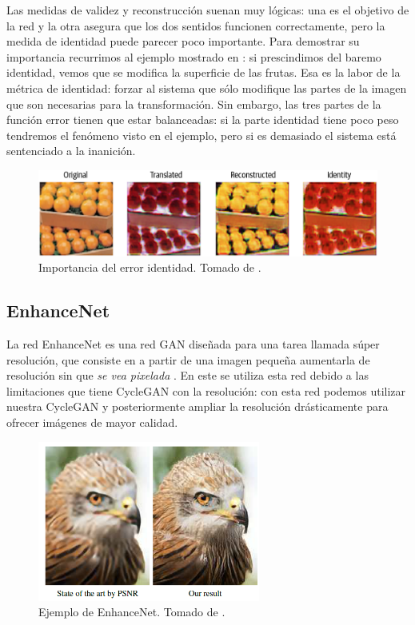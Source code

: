 \documentclass[../main.tex]{subfiles}
\begin{document}
Las medidas de validez y reconstrucción suenan muy lógicas: una es el objetivo de la red y la otra asegura que los dos sentidos funcionen correctamente, pero la medida de identidad puede parecer poco importante. Para demostrar su importancia recurrimos al ejemplo mostrado en \cite{Foster2019}: si prescindimos del baremo identidad, vemos que se modifica la superficie de las frutas. Esa es la labor de la métrica de identidad: forzar al sistema que sólo modifique las partes de la imagen que son necesarias para la transformación. Sin embargo, las tres partes de la función error tienen que estar balanceadas: si la parte identidad tiene poco peso tendremos el fenómeno visto en el ejemplo, pero si es demasiado el sistema está sentenciado a la inanición.

\begin{figure}[h]
    \centering
    \includegraphics[width=1\textwidth]{imagenes/error_identidad_foster.png}
    \caption[Importancia del error identidad]{Importancia del error identidad. Tomado de \cite{Foster2019}.}
    \label{fig:error_identidad_foster}
\end{figure}

\subsection{EnhanceNet}

La red EnhanceNet es una red GAN diseñada para una tarea llamada súper resolución, que consiste en a partir de una imagen pequeña aumentarla de resolución sin que \textit{se vea pixelada} \cite{Sajjadi2016}. En este \tfg se utiliza esta red debido a las limitaciones que tiene CycleGAN con la resolución: con esta red podemos utilizar nuestra CycleGAN y posteriormente ampliar la resolución drásticamente para ofrecer imágenes de mayor calidad. \newline

\begin{figure}[h]
    \centering
    \includegraphics[width=0.65\textwidth]{imagenes/ejemplo_enhancenet.png}
    \caption[Ejemplo de EnhanceNet]{Ejemplo de EnhanceNet. Tomado de \cite{Sajjadi2016}.}
    \label{fig:ejemplo_enhancenet}
\end{figure}
\end{document}

